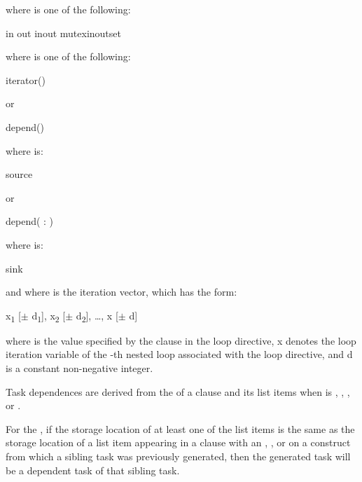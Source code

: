 where  is one of the following:
\begin{indentedcodelist}
in
out
inout
mutexinoutset
\end{indentedcodelist}

where  is one of the following:
\begin{indentedcodelist}
iterator() 
\end{indentedcodelist}

or

\begin{ompSyntax}
depend()
\end{ompSyntax}

where  is:
\begin{indentedcodelist}
source
\end{indentedcodelist}

or

\begin{ompSyntax}
depend( : )
\end{ompSyntax}

where  is:
\begin{indentedcodelist}
sink
\end{indentedcodelist}

and where  is the iteration vector, which has the form:

x\textsubscript{1} [$\pm $ d\textsubscript{1}], x\textsubscript{2} [$\pm $ d\textsubscript{2}], \ldots, x\textsubscript{} [$\pm $ d\textsubscript{}]

where  is the value specified by the  clause in the loop
directive, x\textsubscript{} denotes the loop iteration variable of the -th
nested loop associated with the loop directive, and d\textsubscript{} is a
constant non-negative integer.

\descr
Task dependences are derived from the  of a  clause and its list
items when  is , , , or .

For the  , if the storage location of at least one
of the list items is the same as the storage location of a list item appearing
in a  clause with an , , or   on a construct
from which a sibling task was previously generated, then the generated task
will be a dependent task of that sibling task.

